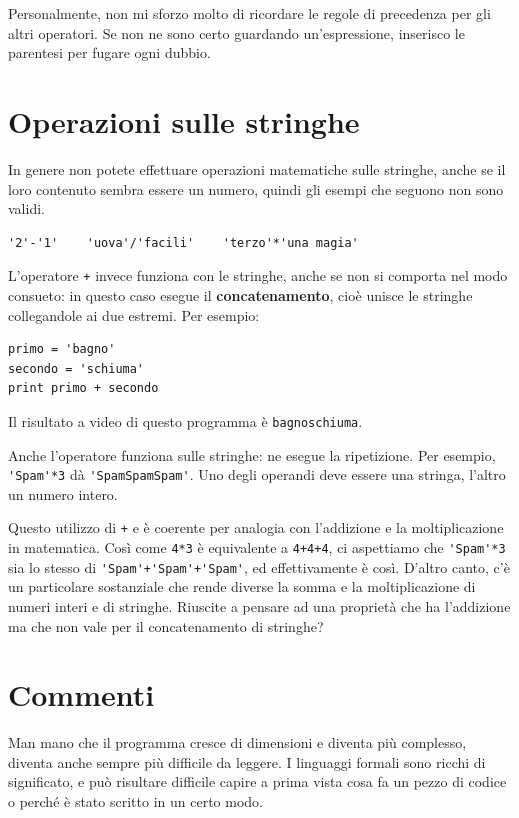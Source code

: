 \documentclass[10pt]{book}
\begin{document}
Personalmente, non mi sforzo molto di ricordare le regole di precedenza per gli altri operatori. Se non ne sono certo guardando un'espressione, inserisco le parentesi per fugare ogni dubbio.

\section{Operazioni sulle stringhe}

In genere non potete effettuare operazioni matematiche sulle stringhe, anche se il loro contenuto sembra essere un numero, quindi gli esempi che seguono non sono validi.

\begin{verbatim}
'2'-'1'    'uova'/'facili'    'terzo'*'una magia'
\end{verbatim}
%
L'operatore {\tt +} invece funziona con le stringhe, anche se non si comporta nel modo consueto: in questo caso esegue il {\bf concatenamento}, cioè unisce le stringhe collegandole ai due estremi. Per esempio:

\begin{verbatim}
primo = 'bagno'
secondo = 'schiuma'
print primo + secondo
\end{verbatim}
%
Il risultato a video di questo programma è {\tt bagnoschiuma}.

Anche l'operatore {\tt *} funziona sulle stringhe: ne esegue la ripetizione. Per esempio, \verb"'Spam'*3" dà \verb"'SpamSpamSpam'". Uno degli operandi deve essere una stringa, l'altro un numero intero.

Questo utilizzo di {\tt +} e {\tt *} è coerente per analogia con l'addizione e la moltiplicazione in matematica. Così come {\tt 4*3} è equivalente a {\tt 4+4+4}, ci aspettiamo che \verb"'Spam'*3" sia lo stesso di
\verb"'Spam'+'Spam'+'Spam'", ed effettivamente è così. D'altro canto, c'è un particolare sostanziale che rende diverse la somma e la moltiplicazione di numeri interi e di stringhe. Riuscite a pensare ad una proprietà che ha l'addizione ma che non vale per il concatenamento di stringhe?


\section{Commenti}

Man mano che il programma cresce di dimensioni e diventa più complesso, diventa anche sempre più difficile da leggere. I linguaggi formali sono ricchi di significato, e può risultare difficile capire a prima vista cosa fa un pezzo di codice o perché è stato scritto in un certo modo.
\end{document}
